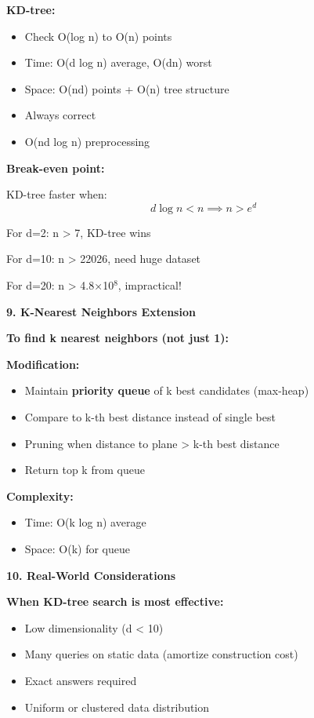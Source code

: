 \documentclass[12pt]{article}
\begin{document}
\begin{explanation}
\textbf{KD-tree:}
\begin{itemize}
    \item Check O(log n) to O(n) points
    \item Time: O(d log n) average, O(dn) worst
    \item Space: O(nd) points + O(n) tree structure
    \item Always correct
    \item O(nd log n) preprocessing
\end{itemize}

\textbf{Break-even point:}

KD-tree faster when:
\[
d \log n < n \implies n > e^d
\]

For d=2: n > 7, KD-tree wins

For d=10: n > 22026, need huge dataset

For d=20: n > 4.8×10$^8$, impractical!

\textbf{9. K-Nearest Neighbors Extension}

\textbf{To find k nearest neighbors (not just 1):}

\textbf{Modification:}
\begin{itemize}
    \item Maintain \textbf{priority queue} of k best candidates (max-heap)
    \item Compare to k-th best distance instead of single best
    \item Pruning when distance to plane > k-th best distance
    \item Return top k from queue
\end{itemize}

\textbf{Complexity:}
\begin{itemize}
    \item Time: O(k log n) average
    \item Space: O(k) for queue
\end{itemize}

\textbf{10. Real-World Considerations}

\textbf{When KD-tree search is most effective:}
\begin{itemize}
    \item Low dimensionality (d < 10)
    \item Many queries on static data (amortize construction cost)
    \item Exact answers required
    \item Uniform or clustered data distribution
\end{itemize}


\end{explanation}
\end{document}
